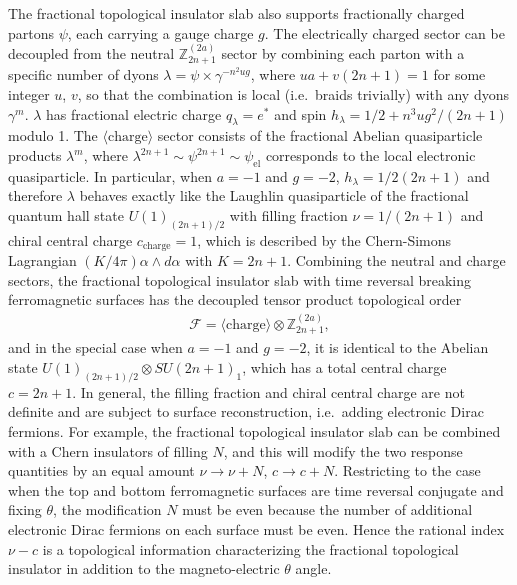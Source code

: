 The fractional topological insulator slab also supports fractionally charged partons $\psi$, each carrying a gauge charge $g$. The electrically charged sector can be decoupled from the neutral $\mathbb{Z}_{2n+1}^{(2a)}$ sector by combining each parton with a specific number of dyons $\lambda=\psi\times\gamma^{-n^2ug}$, where $ua+v(2n+1)=1$ for some integer $u$, $v$, so that the combination is local (i.e.~braids trivially) with any dyons $\gamma^m$. $\lambda$ has fractional electric charge $q_\lambda=e^\ast$ and spin $h_\lambda=1/2+n^3ug^2/(2n+1)$ modulo 1. The $\langle\mathrm{charge}\rangle$ sector consists of the fractional Abelian quasiparticle products $\lambda^m$, where $\lambda^{2n+1}\sim\psi^{2n+1}\sim\psi_{\mathrm{el}}$ corresponds to the local electronic quasiparticle. In particular, when $a=-1$ and $g=-2$, $h_\lambda=1/2(2n+1)$ and therefore $\lambda$ behaves exactly like the Laughlin quasiparticle of the fractional quantum hall state $U(1)_{(2n+1)/2}$ with filling fraction $\nu=1/(2n+1)$ and chiral central charge $c_{\mathrm{charge}}=1$, which is described by the Chern-Simons Lagrangian $(K/4\pi)\alpha\wedge d\alpha$ with $K=2n+1$.
Combining the neutral and charge sectors, the fractional topological insulator slab with time reversal breaking ferromagnetic surfaces has the decoupled tensor product topological order \begin{align}\mathcal{F}=\langle\mathrm{charge}\rangle\otimes\mathbb{Z}_{2n+1}^{(2a)},\label{FTIFSFS}\end{align} and in the special case when $a=-1$ and $g=-2$, it is identical to the Abelian state $U(1)_{(2n+1)/2}\otimes SU(2n+1)_1$, which has a total central charge $c=2n+1$. In general, the filling fraction and chiral central charge are not definite and are subject to surface reconstruction, 
i.e.~adding electronic Dirac fermions. For example, the fractional topological insulator slab can be combined with a Chern insulators of filling $N$, and this will modify the two response quantities by an equal amount $\nu\to\nu+N$, $c\to c+N$. Restricting to the case when the top and bottom ferromagnetic surfaces are time reversal conjugate and fixing $\theta$, the modification $N$ must be even because the number of additional electronic Dirac fermions on each surface must be even. Hence the rational index $\nu-c$ is a topological information characterizing the fractional topological insulator in addition to the magneto-electric $\theta$ angle. 

